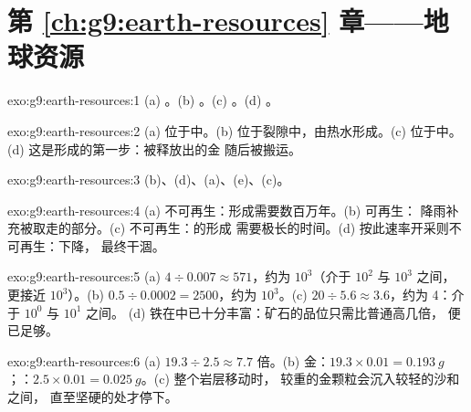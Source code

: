 \section*{第 \ref{ch:g9:earth-resources} 章——地球资源}

\begin{solution}{exo:g9:earth-resources:1}
(a) 。(b) 。(c) 。(d) 。
\end{solution}

\begin{solution}{exo:g9:earth-resources:2}
(a) 位于中。(b) 位于裂隙中，由热水形成。(c) 位于中。
(d) 这是形成的第一步：被释放出的金
随后被搬运。
\end{solution}

\begin{solution}{exo:g9:earth-resources:3}
(b)、(d)、(a)、(e)、(c)。
\end{solution}

\begin{solution}{exo:g9:earth-resources:4}
(a) 不可再生：形成需要数百万年。(b) 可再生：
降雨补充被取走的部分。(c) 不可再生：的形成
需要极长的时间。(d) 按此速率开采则不可再生：下降，
最终干涸。
\end{solution}

\begin{solution}{exo:g9:earth-resources:5}
(a) $4 \div 0.007 \approx 571$，约为 $10^3$（介于 $10^2$ 与 $10^3$ 之间，
更接近 $10^3$）。(b) $0.5 \div 0.0002 = 2500$，约为 $10^3$。(c) $20
\div 5.6 \approx 3.6$，约为 4：介于 $10^0$ 与 $10^1$ 之间。
(d) 铁在中已十分丰富：矿石的品位只需比普通高几倍，
便已足够。
\end{solution}

\begin{solution}{exo:g9:earth-resources:6}
(a) $19.3 \div 2.5 \approx 7.7$ 倍。(b) 金：$19.3 \times 0.01 =
\qty{0.193}{g}$；：$2.5 \times 0.01 = \qty{0.025}{g}$。(c) 整个岩层移动时，
较重的金颗粒会沉入较轻的沙和之间，
直至坚硬的处才停下。
\end{solution}

